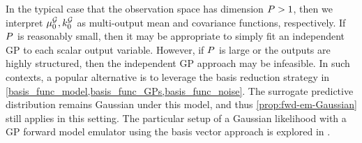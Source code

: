 \documentclass[12pt]{article}
\begin{document}
In the typical case that the observation space has dimension $P > 1$, then we interpret 
$\mu_0^{\mathcal{G}}, k_0^{\mathcal{G}}$ as multi-output mean and covariance functions, respectively.
If $P$ is reasonably small, then it may be appropriate to simply fit an independent GP to 
each scalar output variable. However, if $P$ is large or the outputs are highly structured, 
then the independent GP approach may be infeasible.  
In such contexts, a popular 
alternative is to leverage the basis reduction strategy in \cref{basis_func_model,basis_func_GPs,basis_func_noise}.
The surrogate predictive distribution remains Gaussian under this model, and thus \cref{prop:fwd-em-Gaussian} still applies in this setting. The particular setup of a Gaussian likelihood with a GP forward model emulator using the basis vector approach is explored in \citet{Surer2023sequential}. 
\end{document}
